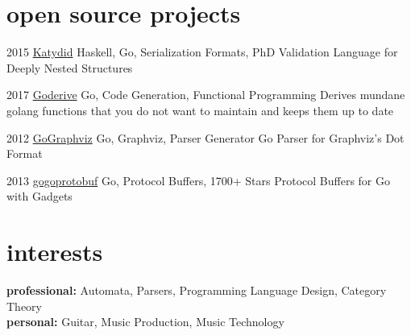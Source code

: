 \documentclass[]{friggeri-cv-a4} %
\begin{document}
\section{open source projects}

\begin{entrylist}

\entry
{2015}
{\href{https://github.com/katydid/katydid}{Katydid}}
{Haskell, Go, Serialization Formats, PhD}
{Validation Language for Deeply Nested Structures}

\entry
{2017}
{\href{https://github.com/awalterschulze/goderive}{Goderive}}
{Go, Code Generation, Functional Programming}
{Derives mundane golang functions that you do not want to maintain and keeps them up to date}

\entry
{2012}
{\href{https://github.com/awalterschulze/gographviz}{GoGraphviz}}
{Go, Graphviz, Parser Generator}
{Go Parser for Graphviz's Dot Format}

\entry
{2013}
{\href{https://github.com/gogo/protobuf}{gogoprotobuf}}
{Go, Protocol Buffers, 1700+ Stars}
{Protocol Buffers for Go with Gadgets}

\end{entrylist}

\section{interests}

\textbf{professional:} Automata, Parsers, Programming Language Design, Category Theory \\
\textbf{personal:} Guitar, Music Production, Music Technology
\end{document}

